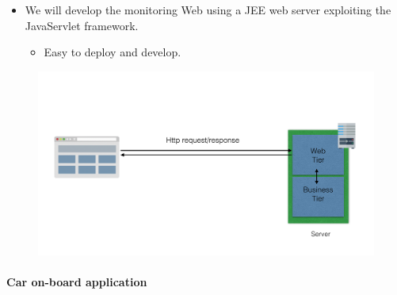 \documentclass[]{article}
\providecommand{\tightlist}{%
  \setlength{\itemsep}{0pt}\setlength{\parskip}{0pt}}
\let\oldparagraph\paragraph
\renewcommand{\paragraph}[1]{\oldparagraph{#1}\mbox{}}
\begin{document}
\begin{itemize}
\tightlist
\item
  We will develop the monitoring Web using a JEE web server exploiting
  the JavaServlet framework.

  \begin{itemize}
  \tightlist
  \item
    Easy to deploy and develop.\newline
  \end{itemize}
\end{itemize}

\begin{figure}[htbp]
\centering
\includegraphics[width=1.00000\textwidth,height=1.00000\textwidth]{./images/webAppArch.png}
\caption{}\label{id}
\end{figure}

\paragraph{Car on-board application}\label{car-on-board-application}
\end{document}
